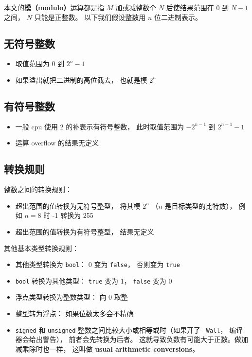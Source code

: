 

本文的\textbf{模（modulo）}运算都是指 $M$ 加或减整数个 $N$ 后使结果范围在 $0$ 到 $N-1$ 之间， $N$ 只能是正整数。 以下我们假设整数用 $n$ 位二进制表示。

\subsection{无符号整数}
\begin{itemize}
\item 取值范围为 $0$ 到 $2^n-1$
\item 如果溢出就把二进制的高位截去， 也就是模 $2^n$
\end{itemize}

\subsection{有符号整数}
\begin{itemize}
\item 一般 cpu 使用 2 的补表示有符号整数， 此时取值范围为 $-2^{n-1}$ 到 $2^{n-1}-1$
\item 运算 overflow 的结果无定义
\end{itemize}

\subsection{转换规则}
整数之间的转换规则：
\begin{itemize}
\item 超出范围的值转换为无符号整型， 将其模 $2^n$ （$n$ 是目标类型的比特数）， 例如 $n = 8$ 时 -1 转换为 255
\item 超出范围的值转换为有符号整型， 结果无定义
\end{itemize}
其他基本类型转换规则：
\begin{itemize}
\item 其他类型转换为 \verb|bool|： 0 变为 \verb|false|， 否则变为 \verb|true|
\item \verb|bool| 转换为其他类型： \verb|true| 变为 1， \verb|false| 变为 0
\item 浮点类型转换为整数类型： 向 0 取整
\item 整型转为浮点： 如果位数太多会不精确
\item \verb|signed| 和 \verb|unsigned| 整数之间比较大小或相等或时（如果开了 \verb|-Wall|， 编译器会给出警告）， 前者会先转换为后者。 这就导致负数有可能大于正数。做加减乘除时也一样， 这叫做 \textbf{usual arithmetic conversions}。
\end{itemize}

